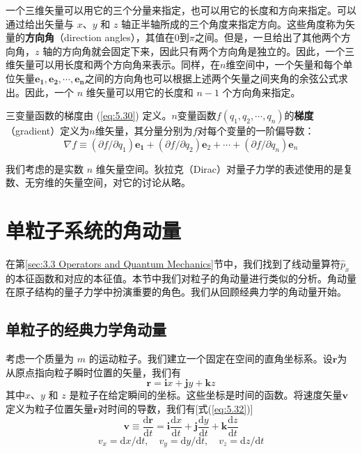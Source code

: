     一个三维矢量可以用它的三个分量来指定，也可以用它的长度和方向来指定。可以通过给出矢量与 $x$、$y$ 和 $z$ 轴正半轴所成的三个角度来指定方向。这些角度称为矢量的\textbf{方向角}（direction angles），其值在$0$到$\pi$之间。但是，一旦给出了其他两个方向角，$z$ 轴的方向角就会固定下来，因此只有两个方向角是独立的。因此，一个三维矢量可以用长度和两个方向角来表示。同样，在$n$维空间中，一个矢量和每个单位矢量$\mathbf{e_1},\mathbf{e_2},\cdots,\mathbf{e_n}$之间的方向角也可以根据上述两个矢量之间夹角的余弦公式求出。因此，一个 $n$ 维矢量可以用它的长度和 $n-1$ 个方向角来指定。

    三变量函数的梯度由 (\ref{eq:5.30}) 定义。$n$变量函数$f\left(q_1,q_2,\cdots,q_n\right)$的\textbf{梯度}（gradient）定义为$n$维矢量，其分量分别为$f$对每个变量的一阶偏导数：
    \begin{equation*}
        \nabla f \equiv \left(\partial f/\partial q_1\right)\mathbf{e_1} + \left(\partial f/\partial q_2\right)\mathbf{e}_2 + \cdots + \left(\partial f/\partial q_n\right)\mathbf{e}_n
    \end{equation*}

    我们考虑的是实数 $n$ 维矢量空间。狄拉克（Dirac）对量子力学的表述使用的是复数、无穷维的矢量空间，对它的讨论从略。

\section{单粒子系统的角动量}
\label{sec:5.3 Angular Momentum of a One-Particle System}
    在第\ref{sec:3.3 Operators and Quantum Mechanics}节中，我们找到了线动量算符$\hat{p}_x$的本征函数和对应的本征值。本节中我们对粒子的角动量进行类似的分析。角动量在原子结构的量子力学中扮演重要的角色。我们从回顾经典力学的角动量开始。

    \subsection*{单粒子的经典力学角动量}
    考虑一个质量为 $m$ 的运动粒子。我们建立一个固定在空间的直角坐标系。设$\mathbf{r}$为从原点指向粒子瞬时位置的矢量，我们有
    \begin{equation}
        \mathbf{r} = \mathbf{i}x + \mathbf{j}y + \mathbf{k}z
        \label{eq:5.33}
    \end{equation}
    其中$x$、$y$ 和 $z$ 是粒子在给定瞬间的坐标。这些坐标是时间的函数。将速度矢量$\mathbf{v}$定义为粒子位置矢量$\mathbf{r}$对时间的导数，我们有[式(\ref{eq:5.32})]
    \begin{equation}
        \mathbf{v} \equiv \frac{\mathrm{d}\mathbf{r}}{\mathrm{d}t} = \mathbf{i}\frac{\mathrm{d}x}{\mathrm{d}t} + \mathbf{j}\frac{\mathrm{d}y}{\mathrm{d}t} + \mathbf{k}\frac{\mathrm{d}z}{\mathrm{d}t}
        \label{eq:5.34}
    \end{equation}
    \begin{equation*}
        v_x = \mathrm{d}x/\mathrm{d}t, \quad v_y = \mathrm{d}y/\mathrm{d}t, \quad v_z = \mathrm{d}z/\mathrm{d}t
    \end{equation*}

